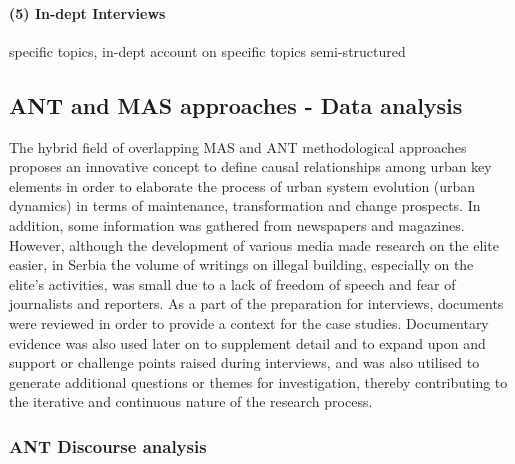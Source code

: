 \documentclass[11pt]{report}
\begin{document}
\paragraph{(5) In-dept Interviews}

specific topics, in-dept account on specific topics
semi-structured

\subsection{ANT and MAS approaches - Data analysis}

The hybrid field of overlapping MAS and ANT methodological approaches proposes an innovative concept to define causal relationships among urban key elements in order to elaborate the process of urban system evolution (urban dynamics) in terms of maintenance, transformation and change prospects. In  addition,  some  information  was  gathered  from  newspapers  and  magazines. However,  although  the  development  of  various  media  made  research  on  the  elite easier, in Serbia the volume of writings on illegal building, especially on the elite’s activities, was small due to a lack of freedom of speech and fear of journalists and reporters. As  a  part  of  the  preparation  for  interviews,  documents  were  reviewed  in  order  to provide  a  context  for  the  case  studies. Documentary evidence was also used later on to supplement detail and to expand upon and support or challenge points raised during interviews, and was also 
utilised  to  generate  additional  questions  or  themes  for  investigation,  thereby contributing to the iterative and continuous nature of the research process.  

\subsubsection{ANT Discourse analysis}
\end{document}
